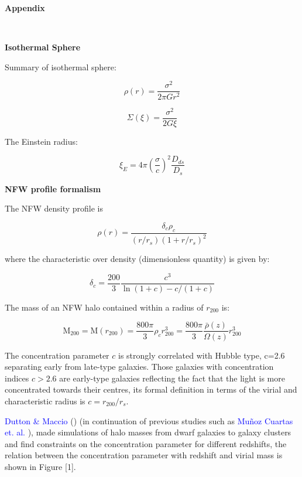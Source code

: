 \newpage
{} 
\begin{appendices}
\textbf{{\LARGE Appendix}}

$\qquad$

\textbf{Isothermal Sphere} 

Summary of isothermal sphere:

\begin{equation}
\rho(r)=\frac{\sigma^2}{2\pi Gr^2}
\end{equation}

\begin{equation}
\Sigma(\xi)=\frac{\sigma^2}{2G\xi}
\end{equation}

The Einstein radius:

\begin{equation}
\xi_{E}=4\pi\left(\frac{\sigma}{c}\right)^{2}\frac{D_{ds}}{D_{s}}
\end{equation} 
 
\textbf{NFW profile formalism}
 
The NFW density profile is 

\begin{equation}
\rho(r)=\frac{\delta_{c}\rho_{c}}{(r/r_{s})(1+r/r_{s})^{2}}
\end{equation}

where the characteristic over density (dimensionless quantity) is given by:

\begin{equation}
\delta_{c}=\frac{200}{3}\frac{c^{3}}{\ln{(1+c)}-c/(1+c)}
\end{equation}

The mass of an NFW halo contained within a radius of $r_{200}$ is:

\begin{equation}
\text{M}_{200}=\text{M}(r_{200})=\frac{800\pi}{3}\rho_{c}r^{3}_{200}=\frac{800\pi}{3}\frac{\bar{\rho}(z)}{\Omega(z)}r^{3}_{200}
\end{equation}

The concentration parameter $c$ is strongly correlated with Hubble type, c=2.6 separating early from late-type galaxies. Those galaxies with concentration indices $c>2.6$ are early-type galaxies reflecting the fact that the light is more concentrated towards their centres, its formal definition in terms of the virial and characteristic radius is $c=r_{200}/r_{s}$.

\textcolor{blue}{Dutton \& Maccio} (\citeyear{Reference23}) (in continuation of previous studies such as \textcolor{blue}{Mu\~noz Cuartas et. al.} \citeyear{Reference12}), made simulations of halo masses from dwarf galaxies to galaxy clusters and find constraints on the concentration parameter for different redshifts, the relation between the concentration parameter with redshift and virial mass is shown in Figure [1].


\end{appendices}
